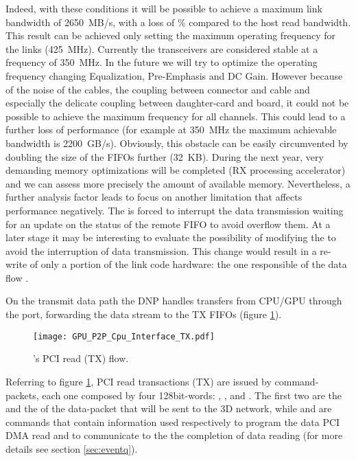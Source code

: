 Indeed, with these conditions it will be possible to achieve a maximum
link bandwidth of 2650~MB/s, with a loss of \% compared
to the host read bandwidth.
This result can be achieved only setting the maximum operating
frequency for the links (425~MHz). Currently the transceivers are
considered stable at a frequency of 350~MHz. In the future we will try
to optimize the operating frequency changing Equalization, 
Pre-Emphasis and DC Gain. However because of
the noise of the cables, the coupling between connector and cable and
especially the delicate coupling between daughter-card and board, it
could not be possible to achieve the maximum frequency for all
channels.  This could lead to a further loss of performance (for
example at 350~MHz the maximum achievable bandwidth is 2200~GB/s).
Obviously, this obstacle can be easily circumvented by doubling the
size of the FIFOs further (32~KB). During the next year, very
demanding memory optimizations will be completed (RX processing
accelerator) and we can assess more precisely the amount of available
memory.
Nevertheless, a further analysis factor  leads to focus on
another limitation that affects performance negatively. The  is forced to interrupt the data transmission waiting for an
update on the status of the remote FIFO to avoid overflow them.
At a later stage it may be interesting to evaluate the possibility of
modifying the  to avoid the interruption of data
transmission.  This change would result in a re-write of only a
portion of the link code hardware: the one responsible of the data
flow .



 \label{sub:TxAcceleration}
On the transmit data path the DNP handles transfers from CPU/GPU
through the \PCIe port, forwarding the data stream to the TX FIFOs
(figure \ref{fig:TX_datapath}).

\begin{figure}[!hbt]
  \centering
  \texttt{[image: GPU\_P2P\_Cpu\_Interface\_TX.pdf]}
  \caption{\apenetp's PCI read (TX) flow.}
  \label{fig:TX_datapath}
\end{figure}

Referring to figure \ref{fig:TX_datapath}, PCI read transactions (TX)
are issued by command-packets, each one composed by four 128bit-words:
\header, \footer,  and . The first two are the
\header and the \footer of the data-packet that will be sent to the 3D
network, while  and  are commands that contain
information used respectively to program the data PCI DMA read and to
communicate to the  the completion of data
reading (for more details see section \ref{sec:eventq}).

